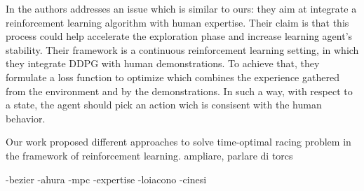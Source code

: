 In \cite{cinesi} the authors addresses an issue which is similar to ours: they aim at integrate a reinforcement learning algorithm with human expertise. Their claim is that this process could help accelerate the exploration phase and increase learning agent's stability.
Their framework is a continuous reinforcement learning setting, in which they integrate DDPG with human demonstrations.
To achieve that, they formulate a loss function to optimize which combines the experience gathered from the environment and by the demonstrations. In such a way, with respect to a state, the agent should pick an action wich is consisent with the human behavior.

 Our work proposed different approaches to solve time-optimal racing problem in the framework of reinforcement learning. ampliare, parlare di torcs
 
 
 
 
-bezier
-ahura
-mpc
-expertise
-loiacono
-cinesi